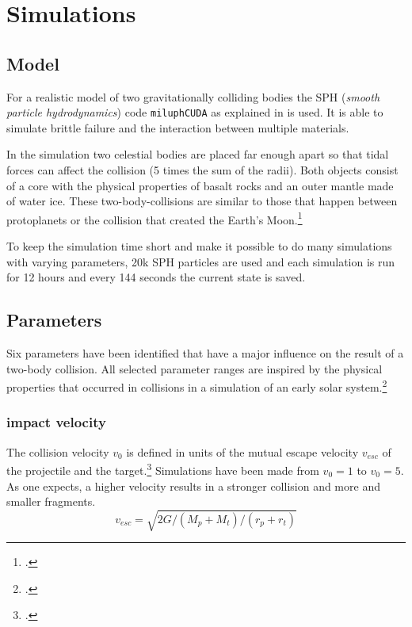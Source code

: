 \chapter{Simulations}
\label{chapter:simulations}
\section{Model}

For a realistic model of two gravitationally colliding bodies the SPH (\textit{smooth particle hydrodynamics}) code \texttt{miluphCUDA} as explained in \cite{Schaefer2016} is used. It is able to simulate brittle failure and the interaction between multiple materials. 

In the simulation two celestial bodies are placed far enough apart so that tidal forces can affect the collision (5 times the sum of the radii). Both objects consist of a core with the physical properties of basalt rocks and an outer mantle made of water ice. These two-body-collisions are similar to those that happen between protoplanets or the collision that created the Earth's Moon.\footcite{dvorakMoon}

To keep the simulation time short and make it possible to do many simulations with varying parameters, 20k SPH particles are used and each simulation is run for 12 hours and every 144 seconds the current state is saved.

\section{Parameters}
\label{sec:parameters}

Six parameters have been identified that have a major influence on the result of a two-body collision. All selected parameter ranges are inspired by the physical properties that occurred in collisions in a simulation of an early solar system.\footcite{CollisionParameters}

\subsection{impact velocity}

The collision velocity $v_0$ is defined in units of the mutual escape velocity $v_{esc}$ of the projectile and the target.\footcite{MaindlSummary} Simulations have been made from $v_0=1$ to $v_0=5$. As one expects, a higher velocity results in a stronger collision and more and smaller fragments.
\begin{equation}
	v_{esc}=\sqrt{2G/(M_p+M_t)/(r_p+r_t)}
\end{equation}

